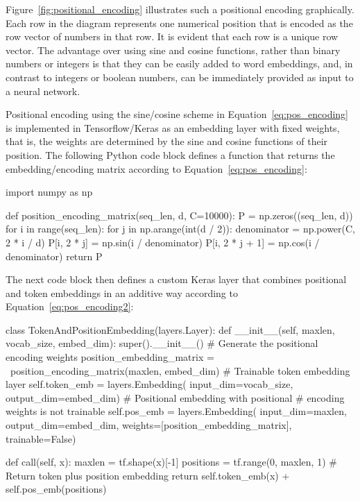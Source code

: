 Figure~\ref{fig:positional_encoding} illustrates such a positional encoding graphically. Each row in the diagram represents one numerical position that is encoded as the row vector of numbers in that row. It is evident that each row is a unique row vector. The advantage over using sine and cosine functions, rather than binary numbers or integers is that they can be easily added to word embeddings, and, in contrast to integers or boolean numbers, can be immediately provided as input to a neural network. 

Positional encoding using the sine/cosine scheme in Equation~\ref{eq:pos_encoding} is implemented  in Tensorflow/Keras as an embedding layer with fixed weights, that is, the weights are determined by the sine and cosine functions of their position. The following Python code block defines a function that returns the embedding/encoding matrix according to Equation~\ref{eq:pos_encoding}:

\begin{pythoncode}
import numpy as np

def position_encoding_matrix(seq_len, d, C=10000):
    P = np.zeros((seq_len, d))
    for i in range(seq_len):
        for j in np.arange(int(d / 2)):
            denominator = np.power(C, 2 * i / d)
            P[i, 2 * j] = np.sin(i / denominator)
            P[i, 2 * j + 1] = np.cos(i / denominator)
    return P
\end{pythoncode}

The next code block then defines a custom Keras layer that combines positional and token embeddings in an additive way according to Equation~\ref{eq:pos_encoding2}:

\begin{pythoncode}
class TokenAndPositionEmbedding(layers.Layer):
    def __init__(self, maxlen, vocab_size, embed_dim):
        super().__init__()
        # Generate the positional encoding weights
        position_embedding_matrix = \
            position_encoding_matrix(maxlen, embed_dim)
        # Trainable token embedding layer
        self.token_emb = layers.Embedding(
            input_dim=vocab_size, 
            output_dim=embed_dim)
        # Positional embedding with positional 
        # encoding weights is not trainable
        self.pos_emb = layers.Embedding(
            input_dim=maxlen, 
            output_dim=embed_dim,
            weights=[position_embedding_matrix],
            trainable=False)

    def call(self, x):
        maxlen = tf.shape(x)[-1]
        positions = tf.range(0, maxlen, 1)
        # Return token plus position embedding
        return self.token_emb(x) + self.pos_emb(positions)
\end{pythoncode}

